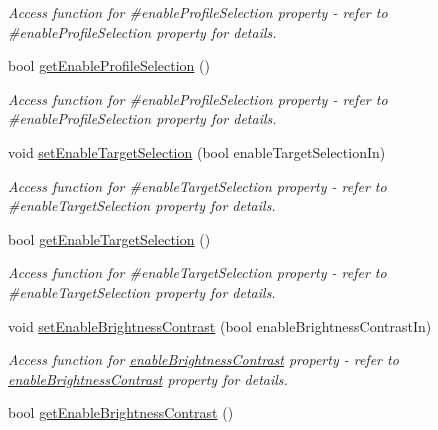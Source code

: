 \begin{DoxyCompactItemize}
\begin{DoxyCompactList}\small\item\em Access function for \#enableProfileSelection property -\/ refer to \#enableProfileSelection property for details. \end{DoxyCompactList}\item 
\hypertarget{classQEImage_aaff7a6265a07365f4950662defc35729}{
bool \hyperlink{classQEImage_aaff7a6265a07365f4950662defc35729}{getEnableProfileSelection} ()}
\label{classQEImage_aaff7a6265a07365f4950662defc35729}

\begin{DoxyCompactList}\small\item\em Access function for \#enableProfileSelection property -\/ refer to \#enableProfileSelection property for details. \end{DoxyCompactList}\item 
\hypertarget{classQEImage_a1842cf95177deae3193b2f8bb522eb46}{
void \hyperlink{classQEImage_a1842cf95177deae3193b2f8bb522eb46}{setEnableTargetSelection} (bool enableTargetSelectionIn)}
\label{classQEImage_a1842cf95177deae3193b2f8bb522eb46}

\begin{DoxyCompactList}\small\item\em Access function for \#enableTargetSelection property -\/ refer to \#enableTargetSelection property for details. \end{DoxyCompactList}\item 
\hypertarget{classQEImage_a1d76ef3e9d2bb9bde79c20c22dba0bbb}{
bool \hyperlink{classQEImage_a1d76ef3e9d2bb9bde79c20c22dba0bbb}{getEnableTargetSelection} ()}
\label{classQEImage_a1d76ef3e9d2bb9bde79c20c22dba0bbb}

\begin{DoxyCompactList}\small\item\em Access function for \#enableTargetSelection property -\/ refer to \#enableTargetSelection property for details. \end{DoxyCompactList}\item 
\hypertarget{classQEImage_af70c9eca7b96f5b8f1183c427c916b4a}{
void \hyperlink{classQEImage_af70c9eca7b96f5b8f1183c427c916b4a}{setEnableBrightnessContrast} (bool enableBrightnessContrastIn)}
\label{classQEImage_af70c9eca7b96f5b8f1183c427c916b4a}

\begin{DoxyCompactList}\small\item\em Access function for \hyperlink{classQEImage_a8d593efab178653a7275b78e22da4fdf}{enableBrightnessContrast} property -\/ refer to \hyperlink{classQEImage_a8d593efab178653a7275b78e22da4fdf}{enableBrightnessContrast} property for details. \end{DoxyCompactList}\item 
\hypertarget{classQEImage_a9acffcf886d6919e6a03fd6923225553}{
bool \hyperlink{classQEImage_a9acffcf886d6919e6a03fd6923225553}{getEnableBrightnessContrast} ()}
\label{classQEImage_a9acffcf886d6919e6a03fd6923225553}


\end{DoxyCompactItemize}
